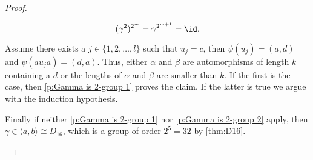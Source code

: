 \begin{proof}
\begin{clist}
\begin{equation*}
(\gamma^2)^{2^m}=\gamma^{2^{m+1}}=\id.
\end{equation*}
\item \label{p:Gamma is 2-group 2} Assume there exists a $j\in\lbrace 1,2,\ldots,l\rbrace$ such that $u_j=c$, then $\psi(u_j)=(a,d)$ and $\psi(au_ja)=(d,a)$. Thus,  either $\alpha$ and $\beta$ are automorphisms of length $k$ containing a $d$ or the lengths of $\alpha$ and $\beta$ are smaller than $k$. If the first is the case, then \ref{p:Gamma is 2-group 1} proves the claim. If the latter is true we argue with the induction hypothesis.
\item Finally if neither \ref{p:Gamma is 2-group 1} nor \ref{p:Gamma is 2-group 2} apply, then $\gamma\in\langle a,b\rangle\cong D_{16}$, which is a group of order $2^5=32$ by \cref{thm:D16}.
\end{clist}
\end{proof}